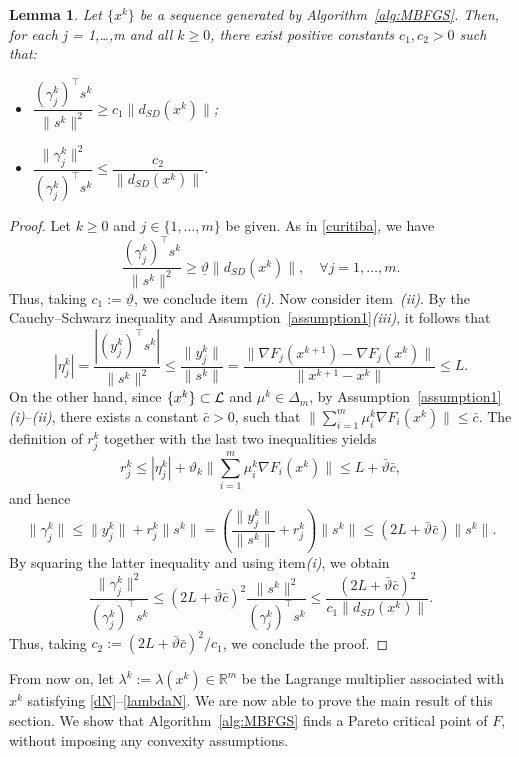 \documentclass[11pt]{article}
\newtheorem{lemma}[theorem]{Lemma}
\numberwithin{assumption}{section}
\newcommand{\R}{\mathbb{R}}
\newcommand{\Ls}{{\cal{L}}}
\newcommand{\dsd}{d_{SD}}
\begin{document}
\begin{lemma}\label{l:goiania}
Let $\{x^k\}$ be a sequence generated by Algorithm~\ref{alg:MBFGS}.
Then, for each j = 1,\ldots,m and all $k\geq 0$, there exist positive constants $c_1,c_2>0$ such that:
\begin{itemize}
\item[(i)] $\dfrac{(\gamma_j^{k})^\top s^k}{\|s^k\|^2}\geq c_1 \|\dsd(x^k)\|$;
\item[(ii)] $\dfrac{\|\gamma_j^{k}\|^2}{(\gamma_j^{k})^\top s^k}\leq \dfrac{c_2}{\|\dsd(x^k)\|}$.
\end{itemize}
\end{lemma}
\begin{proof}
Let $k\geq 0$ and $j\in\{1,\ldots,m\}$ be given. As in \eqref{curitiba}, we have
$$\dfrac{(\gamma_j^{k})^\top s^k}{\|s^k\|^2}  \geq \underline{\vartheta} \|\dsd(x^k)\|,  \quad \forall j=1,\ldots,m.$$
Thus, taking $c_1:=\underline{\vartheta}$, we conclude item~{\it(i)}.
Now consider item~{\it(ii)}. 
By the Cauchy--Schwarz inequality and Assumption~\ref{assumption1}{\it(iii)}, it follows that
$$|\eta_j^k|=  \dfrac{|(y_{j}^k)^\top s^k|}{\|s^k\|^2}\leq \dfrac{\|y_{j}^k\|}{\|s^k\|} = \dfrac{\|\nabla F_{j}(x^{k+1})-\nabla F_j(x^k)\|}{\|x^{k+1}-x^{k}\|}\leq L.$$
On the other hand, since $\{x^k\}\subset\Ls$ and $\mu^k\in\Delta_m$, by Assumption~\ref{assumption1}{\it(i)}--{\it(ii)}, there exists a constant $\bar{c}>0$, such that $\|\sum_{i=1}^m\mu_i^k \nabla F_i(x^k)\|\leq \bar{c}$.
The definition of $r_j^k$ together with the last two inequalities yields 
$$r_j^k\leq |\eta_j^k| + \vartheta_k \|\sum_{i=1}^m\mu_i^k \nabla F_i(x^k)\| \leq L+ \bar{\vartheta}\bar{c},$$
and hence
$$\|\gamma_j^k\| \leq  \|y_j^k\| + r_j^k \|s^k\| = \left(\dfrac{\|y_j^k\|}{\|s^k\|} + r_j^k \right) \|s^k\| \leq (2L+ \bar{\vartheta}\bar{c}) \|s^k\|.$$
By squaring the latter inequality and using item{\it(i)}, we obtain
$$\dfrac{\|\gamma_j^{k}\|^2}{(\gamma_j^{k})^\top s^k}\leq (2L+ \bar{\vartheta}\bar{c})^2 \dfrac{ \|s^k\|^2}{(\gamma_j^{k})^\top s^k}  \leq \dfrac{(2L+ \bar{\vartheta}\bar{c})^2}{c_1 \|\dsd(x^k)\|}.$$
Thus, taking $c_2:=(2L+ \bar{\vartheta}\bar{c})^2/c_1$, we conclude the proof.
\end{proof}

From now on, let $\lambda^k:= \lambda(x^k)\in\R^m$ be the Lagrange multiplier associated with $x^k$  satisfying \eqref{dN}--\eqref{lambdaN}.
We are now able to prove the main result of this section. 
We show that Algorithm~\ref{alg:MBFGS} finds a Pareto critical point of $F$, without imposing any convexity assumptions.
\end{document}
